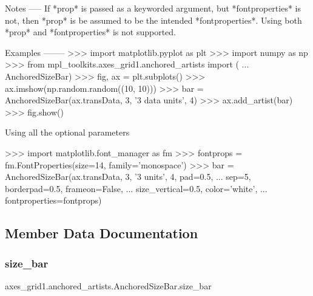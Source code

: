\begin{DoxyVerb}
Notes
-----
If *prop* is passed as a keyworded argument, but *fontproperties* is
not, then *prop* is be assumed to be the intended *fontproperties*.
Using both *prop* and *fontproperties* is not supported.

Examples
--------
>>> import matplotlib.pyplot as plt
>>> import numpy as np
>>> from mpl_toolkits.axes_grid1.anchored_artists import (
...     AnchoredSizeBar)
>>> fig, ax = plt.subplots()
>>> ax.imshow(np.random.random((10, 10)))
>>> bar = AnchoredSizeBar(ax.transData, 3, '3 data units', 4)
>>> ax.add_artist(bar)
>>> fig.show()

Using all the optional parameters

>>> import matplotlib.font_manager as fm
>>> fontprops = fm.FontProperties(size=14, family='monospace')
>>> bar = AnchoredSizeBar(ax.transData, 3, '3 units', 4, pad=0.5,
...                       sep=5, borderpad=0.5, frameon=False,
...                       size_vertical=0.5, color='white',
...                       fontproperties=fontprops)
\end{DoxyVerb}
 

\subsection{Member Data Documentation}
\mbox{\label{classaxes__grid1_1_1anchored__artists_1_1AnchoredSizeBar_a39070142bc27121b01115ced472df035}} 
\subsubsection{\texorpdfstring{size\+\_\+bar}{size\_bar}}
{\footnotesize\ttfamily axes\+\_\+grid1.\+anchored\+\_\+artists.\+Anchored\+Size\+Bar.\+size\+\_\+bar}

\mbox{\label{classaxes__grid1_1_1anchored__artists_1_1AnchoredSizeBar_a7debb95f72c21abf57883b2e6e913510}} 
